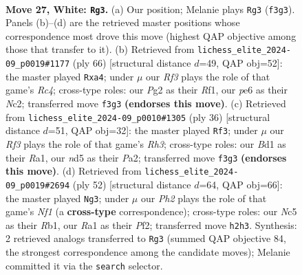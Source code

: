 \documentclass[11pt]{article}
\begin{document}
\clearpage

\begin{figure}[p]\centering
\begin{subfigure}{0.46\textwidth}\centering
\resizebox{\linewidth}{!}{%
\newchessgame
\chessboard[
  setfen={5r1k/4rppp/1n2p3/pbNn2P1/8/1P2PR2/P5PP/RN1B2K1 w - - 3 27},
  showmover=false,
  pgfstyle=straightmove, color=movearrow, markmove={f3-g3}
]}
\caption{}
\end{subfigure}\hfill
\begin{subfigure}{0.46\textwidth}\centering
\resizebox{\linewidth}{!}{%
\newchessgame
\chessboard[
  setfen={1rn3k1/2pr1pp1/1p3n1p/1P3P2/p1RP3P/P5P1/2N2PB1/5RK1 w - - 2 34},
  showmover=false,
  pgfstyle=straightmove, color=movearrow, markmove={c4-a4}
]}
\caption{}
\end{subfigure}
\\[4pt]
\begin{subfigure}{0.46\textwidth}\centering
\resizebox{\linewidth}{!}{%
\newchessgame
\chessboard[
  setfen={2k4r/1p1r1ppp/p4n2/2b2PB1/6n1/2N4R/PPB2PPP/R5K1 w - - 0 19},
  showmover=false,
  pgfstyle=straightmove, color=movearrow, markmove={h3-f3}
]}
\caption{}
\end{subfigure}\hfill
\begin{subfigure}{0.46\textwidth}\centering
\resizebox{\linewidth}{!}{%
\newchessgame
\chessboard[
  setfen={3r4/ppr2k2/2p2p1p/3n2p1/3P2P1/P3P3/2R2PP1/1R3NK1 w - - 5 27},
  showmover=false,
  pgfstyle=straightmove, color=movearrow, markmove={f1-g3}
]}
\caption{}
\end{subfigure}
\caption{\textbf{Move 27, White: \texttt{Rg3}.} (a) Our position; Melanie plays \texttt{Rg3} (\texttt{f3g3}). Panels (b)--(d) are the retrieved master positions whose correspondence most drove this move (highest QAP objective among those that transfer to it). (b) Retrieved from \texttt{lichess\_elite\_2024-09\_p0019\#1177} (ply 66) [structural distance $d$=49, QAP obj=52]: the master played \texttt{Rxa4}; under $\mu$ our \emph{Rf3} plays the role of that game's \emph{Rc4}; cross-type roles: our \emph{P}g2 as their \emph{R}f1, our \emph{p}e6 as their \emph{N}c2; transferred move \texttt{f3g3} \textbf{(endorses this move)}. (c) Retrieved from \texttt{lichess\_elite\_2024-09\_p0010\#1305} (ply 36) [structural distance $d$=51, QAP obj=32]: the master played \texttt{Rf3}; under $\mu$ our \emph{Rf3} plays the role of that game's \emph{Rh3}; cross-type roles: our \emph{B}d1 as their \emph{R}a1, our \emph{n}d5 as their \emph{P}a2; transferred move \texttt{f3g3} \textbf{(endorses this move)}. (d) Retrieved from \texttt{lichess\_elite\_2024-09\_p0019\#2694} (ply 52) [structural distance $d$=64, QAP obj=66]: the master played \texttt{Ng3}; under $\mu$ our \emph{Ph2} plays the role of that game's \emph{Nf1} (a \textbf{cross-type} correspondence); cross-type roles: our \emph{N}c5 as their \emph{R}b1, our \emph{R}a1 as their \emph{P}f2; transferred move \texttt{h2h3}. Synthesis: 2 retrieved analogs transferred to \texttt{Rg3} (summed QAP objective 84, the strongest correspondence among the candidate moves); Melanie committed it via the \texttt{search} selector.}
\label{fig:thought-m52}
\end{figure}
\end{document}
